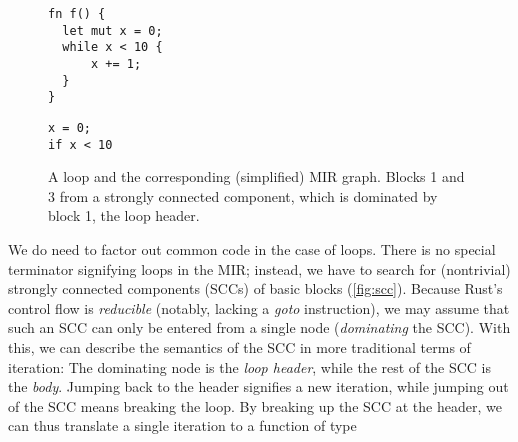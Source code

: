 \begin{figure}[!b]
\hspace{1cm}\begin{minipage}[t]{0.4\textwidth}
  \begin{verbatim}
fn f() {
  let mut x = 0;
  while x < 10 {
      x += 1;
  }
}
  \end{verbatim}
\end{minipage}
\hfill\vline\hfill\begin{adjustbox}{valign=t,minipage={0.4\textwidth}}
  \newsavebox{\mintedbox}
  \begin{lrbox}{\mintedbox}
    \begin{minipage}[t]{1.8cm}
\begin{verbatim}
x = 0;
if x < 10
\end{verbatim}
    \end{minipage}
  \end{lrbox}
\end{adjustbox}

\caption{A  loop and the corresponding (simplified) MIR graph.
  Blocks 1 and 3 from a strongly connected component, which is dominated by
  block 1, the loop header.}
\label{fig:scc}

\end{figure}

We do need to factor out common code in the case of loops. There is no special
terminator signifying loops in the MIR; instead, we have to search for
(nontrivial) strongly connected components (SCCs) of basic blocks (\autoref{fig:scc}). Because Rust's
control flow is \emph{reducible} (notably, lacking a \emph{goto} instruction),
we may assume that such an SCC can only be entered from a single node
(\emph{dominating} the SCC). With this, we can describe the semantics of the SCC
in more traditional terms of iteration: The dominating node is the \emph{loop
  header}, while the rest of the SCC is the \emph{body}. Jumping back to the
header signifies a new iteration, while jumping out of the SCC means breaking
the loop. By breaking up the SCC at the header, we can thus translate a single
iteration to a function of type

